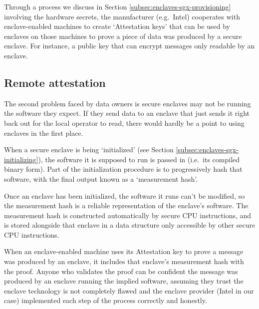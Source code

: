 Through a process we discuss in Section \ref{subsec:enclaves-sgx-provisioning} involving the hardware secrets, the manufacturer (e.g.\ Intel) cooperates with enclave-enabled machines to create `Attestation keys' that can be used by enclaves on those machines to prove a piece of data was produced by a secure enclave. For instance, a public key that can encrypt messages only readable by an enclave.


\subsection{Remote attestation}
\label{subsec:simple-enclaves-remote-attestation}

The second problem faced by data owners is secure enclaves may not be running the software they expect. If they send data to an enclave that just sends it right back out for the local operator to read, there would hardly be a point to using enclaves in the first place.

When a secure enclave is being `initialized' (see Section \ref{subsec:enclaves-sgx-initializing}), the software it is supposed to run is passed in (i.e.\ its compiled binary form). Part of the initialization procedure is to progressively hash that software, with the final output known as a `measurement hash'. \cite{intel-sgx-explained-advanced}

Once an enclave has been initialized, the software it runs can't be modified, so the measurement hash is a reliable representation of the enclave's software. The measurement hash is constructed automatically by secure CPU instructions, and is stored alongside that enclave in a data structure only accessible by other secure CPU instructions.%

When an enclave-enabled machine uses its Attestation key to prove a message was produced by an enclave, it includes that enclave's measurement hash with the proof. Anyone who validates the proof can be confident the message was produced by an enclave running the implied software, assuming they trust the enclave technology is not completely flawed and the enclave provider (Intel in our case) implemented each step of the process correctly and honestly.\\

